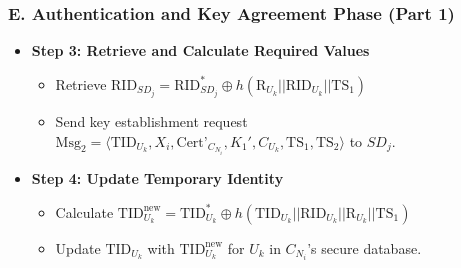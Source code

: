 \documentclass[9pt,handout]{beamer}
\begin{document}
\begin{frame}
    \frametitle{E. Authentication and Key Agreement Phase (Part 1)}


    \begin{itemize}

        \item \textbf{Step 3: Retrieve and Calculate Required Values}
        \begin{itemize}
            \item Retrieve \( \text{RID}_{SD_j} = \text{RID}^*_{SD_j} \oplus h(\text{R}_{U_k} || \text{RID}_{U_k} || \text{TS}_1) \)
            \item Send key establishment request \( \text{Msg}_2 = \langle \text{TID}_{U_k}, X_i, \text{Cert'}_{C_{N_i}}, K_1', C_{U_k}, \text{TS}_1, \text{TS}_2 \rangle \) to \( SD_j \).
        \end{itemize}

        \item \textbf{Step 4: Update Temporary Identity}
        \begin{itemize}
            \item Calculate \( \text{TID}_{U_k}^{\text{new}} = \text{TID}^*_{U_k} \oplus h(\text{TID}_{U_k} || \text{RID}_{U_k} || \text{R}_{U_k} || \text{TS}_1) \)
            \item Update \( \text{TID}_{U_k} \) with \( \text{TID}_{U_k}^{\text{new}} \) for \( U_k \) in \( C_{N_i} \)'s secure database.
        \end{itemize}
    \end{itemize}

\end{frame}
\end{document}
